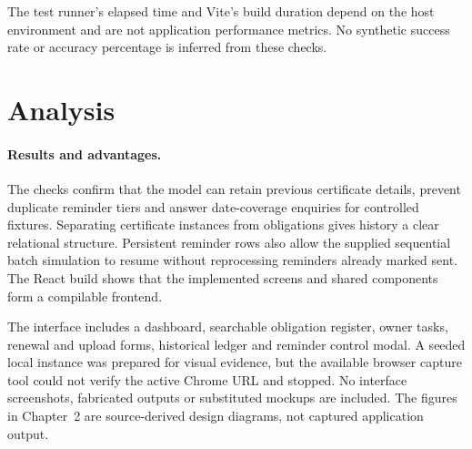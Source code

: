 The test runner's elapsed time and Vite's build duration depend on the host environment and are not application performance metrics. No synthetic success rate or accuracy percentage is inferred from these checks.

\section{Analysis}
\paragraph{Results and advantages.}
The checks confirm that the model can retain previous certificate details, prevent duplicate reminder tiers and answer date-coverage enquiries for controlled fixtures. Separating certificate instances from obligations gives history a clear relational structure. Persistent reminder rows also allow the supplied sequential batch simulation to resume without reprocessing reminders already marked sent. The React build shows that the implemented screens and shared components form a compilable frontend.

The interface includes a dashboard, searchable obligation register, owner tasks, renewal and upload forms, historical ledger and reminder control modal. A seeded local instance was prepared for visual evidence, but the available browser capture tool could not verify the active Chrome URL and stopped. No interface screenshots, fabricated outputs or substituted mockups are included. The figures in Chapter~2 are source-derived design diagrams, not captured application output.

